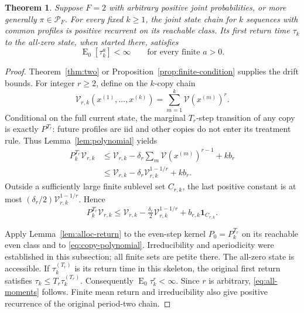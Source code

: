 \documentclass[12pt,a4paper]{article}
\newtheorem{theorem}{Theorem}
\theoremstyle{definition}
\theoremstyle{remark}\newtheorem{remark}{Remark}
\numberwithin{equation}{section}
\newcommand{\E}{\operatorname{E}}
\newcommand{\one}{\mathbf1}
\begin{document}
\begin{theorem}\label{thm:recurrence}
Suppose $F=2$ with arbitrary positive joint probabilities, or more generally $\pi\in\mathcal P_F$. For every fixed $k\ge1$, the joint state chain for $k$ sequences with common profiles is positive recurrent on its reachable class. Its first return time $\tau_k$ to the all-zero state, when started there, satisfies
\begin{equation}\label{eq:all-moments}
 \E_0[\tau_k^a]<\infty\qquad\text{for every finite }a>0.
\end{equation}

\end{theorem}
\begin{proof}
Theorem~\ref{thm:two} or Proposition~\ref{prop:finite-condition} supplies the drift bounds. For integer $r\ge2$, define on the $k$-copy chain
\[
 \mathcal V_{r,k}(x^{(1)},\ldots,x^{(k)})=\sum_{m=1}^k \mathcal V(x^{(m)})^r.
\]
Conditional on the full current state, the marginal $T_r$-step transition of any copy is exactly $P^{T_r}$: future profiles are iid and other copies do not enter its treatment rule. Thus Lemma~\ref{lem:polynomial} yields
\begin{align*}
 P_k^{T_r}\mathcal V_{r,k}
 &\le \mathcal V_{r,k}-\delta_r\sum_m\mathcal V(x^{(m)})^{r-1}+kb_r\\
 &\le \mathcal V_{r,k}-\delta_r\mathcal V_{r,k}^{1-1/r}+kb_r.
\end{align*}
Outside a sufficiently large finite sublevel set $C_{r,k}$, the last positive constant is at most $(\delta_r/2)\mathcal V_{r,k}^{1-1/r}$. Hence
\begin{equation}\label{eq:copy-polynomial}
 P_k^{T_r}\mathcal V_{r,k}
 \le \mathcal V_{r,k}-\tfrac{\delta_r}{2}\mathcal V_{r,k}^{1-1/r}
             +b_{r,k}\one_{C_{r,k}}.
\end{equation}

Apply Lemma~\ref{lem:alloc-return} to the even-step kernel $P_0=P_k^{T_r}$ on its reachable even class and to \eqref{eq:copy-polynomial}. Irreducibility and aperiodicity were established in this subsection; all finite sets are petite there. The all-zero state is accessible. If $\tau_k^{(T_r)}$ is its return time in this skeleton, the original first return satisfies $\tau_k\le T_r\tau_k^{(T_r)}$. Consequently $\E_0\tau_k^r<\infty$. Since $r$ is arbitrary, \eqref{eq:all-moments} follows. Finite mean return and irreducibility also give positive recurrence of the original period-two chain.
\end{proof}
\end{document}
